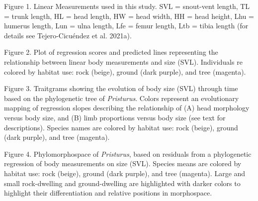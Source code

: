 \documentclass[
]{article}
\begin{document}
Figure 1. Linear Measurements used in this study. SVL = snout-vent
length, TL = trunk length, HL = head length, HW = head width, HH = head
height, Lhu = humerus length, Lun = ulna length, Lfe = femur length, Ltb
= tibia length (for details see Tejero-Cicuéndez et al. 2021a).
\hfill\break

Figure 2. Plot of regression scores and predicted lines representing the
relationship between linear body measurements and size (SVL).
Individuals re colored by habitat use: rock (beige), ground (dark
purple), and tree (magenta). \hfill\break

Figure 3. Traitgrams showing the evolution of body size (SVL) through
time based on the phylogenetic tree of \emph{Pristurus}. Colors
represent an evolutionary mapping of regression slopes describing the
relationship of (A) head morphology versus body size, and (B) limb
proportions versus body size (see text for descriptions). Species names
are colored by habitat use: rock (beige), ground (dark purple), and tree
(magenta). \hfill\break

Figure 4. Phylomorphospace of \emph{Pristurus}, based on residuals from
a phylogenetic regression of body measurements on size (SVL). Species
means are colored by habitat use: rock (beige), ground (dark purple),
and tree (magenta). Large and small rock-dwelling and ground-dwelling
are highlighted with darker colors to highlight their differentiation
and relative positions in morphospace.

\newpage
\end{document}
